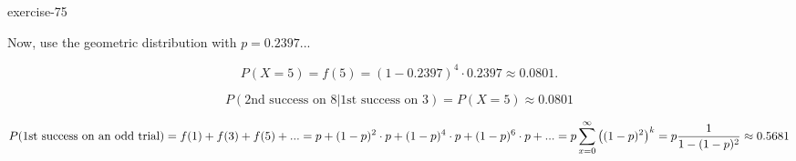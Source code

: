 \documentclass[10pt,]{book}
\numberwithin{equation}{section}
\begin{document}
\begin{inlineexercise}{}{exercise-75}
%
\par
\hypertarget{p-1110}{}%
Now, use the geometric distribution with \(p = 0.2397\text{...}\)%
\par
\hypertarget{p-1111}{}%
%
\begin{equation*}
P(X = 5) = f(5) = (1-0.2397)^4 \cdot 0.2397 \approx 0.0801.
\end{equation*}
%
\par
\hypertarget{p-1112}{}%
%
\begin{equation*}
P(\text{2nd success on 8} | \text{1st success on 3}) = P(X = 5) \approx 0.0801
\end{equation*}
%
\par
\hypertarget{p-1113}{}%
%
\begin{equation*}
P(\text{1st success on an odd trial}) = f(1) + f(3) + f(5) + ... \\ 
= p + (1-p)^2 \cdot p + (1-p)^4 \cdot p + (1-p)^6 \cdot p + ... \\
= p \sum_{x=0}^{\infty} \left ( (1-p)^2 \right)^k = p \frac{1}{1-(1-p)^2} \approx 0.5681
\end{equation*}
%
\end{inlineexercise}
%
%
%
\typeout{************************************************}
\typeout{************************************************}
%
\end{document}
